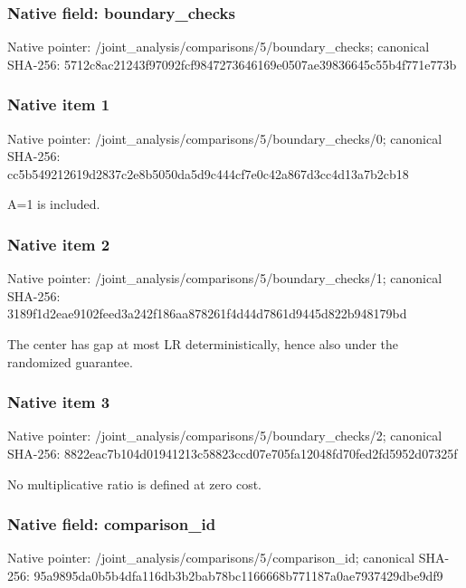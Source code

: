 \documentclass[10pt,a4paper]{article}
\begin{document}
\subsubsection{Native field: boundary\_\allowbreak{}checks}
Native pointer: /joint\_\allowbreak{}analysis/comparisons/5/boundary\_\allowbreak{}checks; canonical SHA-256: 5712c8ac21243f97092fcf9847273646169e0507ae39836645c55b4f771e773b

\subsubsection{Native item 1}
Native pointer: /joint\_\allowbreak{}analysis/comparisons/5/boundary\_\allowbreak{}checks/0; canonical SHA-256: cc5b549212619d2837c2e8b5050da5d9c444cf7e0c42a867d3cc4d13a7b2cb18

\begingroup\raggedright\sloppy A=\allowbreak{}1 is included.\par\endgroup

\subsubsection{Native item 2}
Native pointer: /joint\_\allowbreak{}analysis/comparisons/5/boundary\_\allowbreak{}checks/1; canonical SHA-256: 3189f1d2eae9102feed3a242f186aa878261f4d44d7861d9445d822b948179bd

\begingroup\raggedright\sloppy The center has gap at most LR deterministically,\allowbreak{} hence also under the randomized guarantee.\par\endgroup

\subsubsection{Native item 3}
Native pointer: /joint\_\allowbreak{}analysis/comparisons/5/boundary\_\allowbreak{}checks/2; canonical SHA-256: 8822eac7b104d01941213c58823ccd07e705fa12048fd70fed2fd5952d07325f

\begingroup\raggedright\sloppy No multiplicative ratio is defined at zero cost.\par\endgroup

\subsubsection{Native field: comparison\_\allowbreak{}id}
Native pointer: /joint\_\allowbreak{}analysis/comparisons/5/comparison\_\allowbreak{}id; canonical SHA-256: 95a9895da0b5b4dfa116db3b2bab78bc1166668b771187a0ae7937429dbe9df9
\end{document}
